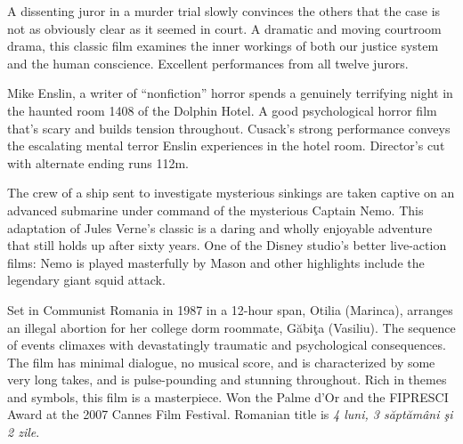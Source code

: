    A dissenting juror in a murder trial slowly convinces the others that the case is not as obviously clear as it seemed in court. A dramatic and moving courtroom drama, this classic film examines the inner workings of both our justice system and the human conscience. Excellent performances from all twelve jurors. \author{DW}

   Mike Enslin, a writer of ``nonfiction'' horror spends a genuinely terrifying night in the haunted room 1408 of the Dolphin Hotel. A good psychological horror film that's scary and builds tension throughout. Cusack's strong performance conveys the escalating mental terror Enslin experiences in the hotel room. Director's cut with alternate ending runs 112m. \author{DW} 

   The crew of a ship sent to investigate mysterious sinkings are taken captive on an advanced submarine under command of the mysterious Captain Nemo. This adaptation of Jules Verne's classic is a daring and wholly enjoyable adventure that still holds up after sixty years. One of the Disney studio's better live-action films: Nemo is played masterfully by Mason and other highlights include the legendary giant squid attack. \author{DW}

\iffalse{\fourplus}\fi {}  Set in Communist Romania in 1987 in a 12-hour span, Otilia (Marinca), arranges an illegal abortion for her college dorm roommate, G\u{a}bi\c{t}a (Vasiliu). The sequence of events climaxes with devastatingly traumatic and psychological consequences. The film has minimal dialogue, no musical score, and is characterized by some very long takes, and is pulse-pounding and stunning throughout. Rich in themes and symbols, this film is a masterpiece. Won the Palme d'Or and the FIPRESCI Award at the 2007 Cannes Film Festival. Romanian title is \textit{4 luni, 3 s\u{a}pt\u{a}m\^{a}ni \c{s}i 2 zile}. \author{AW}

\iffalse
\movie{400 Blows, The}{1959}{99m}{\four} \dir{Fran\c{c}ois Truffaut} \cast{Jean-Pierre L\'{e}aud; Albert R\'{e}my; Claire Maurier} \author{AW}
\fi
